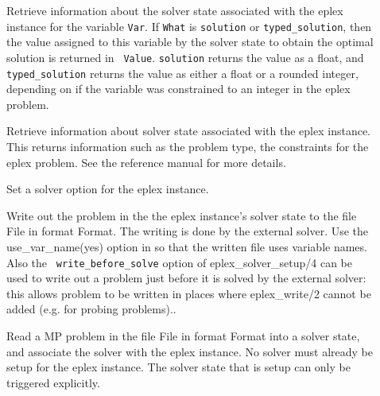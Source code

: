\begin{sloppypar}
\begin{description}
\item[]

Retrieve information about the solver state associated with the eplex
instance for the variable {\tt Var}. If {\tt What} is {\tt solution} or
{\tt typed_solution}, then the value assigned to this variable by the
solver state to obtain the optimal solution is returned in {\tt
Value}. {\tt solution} returns the value as a float, and {\tt
typed_solution} returns the value as either a float or a rounded integer, depending
on if the variable was constrained to an integer in the eplex problem.

\item[]

Retrieve information about solver state associated with the eplex instance.
This returns information such as the problem type, the constraints for the
eplex problem. See the reference manual for more details.

\item[]
Set a solver option for the eplex instance. 
\item[]
Write out the problem in the the eplex instance's solver state to the file
File in format Format. The writing is done by the external solver. Use the
use_var_name(yes) option in
so that the written file uses \eclipse variable names. Also the {\tt
write_before_solve} option of eplex_solver_setup/4 can be used to write out
a problem just before it is solved by the external solver: this allows
problem to be written in places where eplex_write/2 cannot be added
(e.g. for probing problems)..

\item[]
Read a MP problem in the file File in format Format into a solver state,
and associate the solver with the eplex instance. No solver must already be
setup for the eplex instance. The solver state that is setup can only be
triggered explicitly.

\end{description}
\end{sloppypar}

